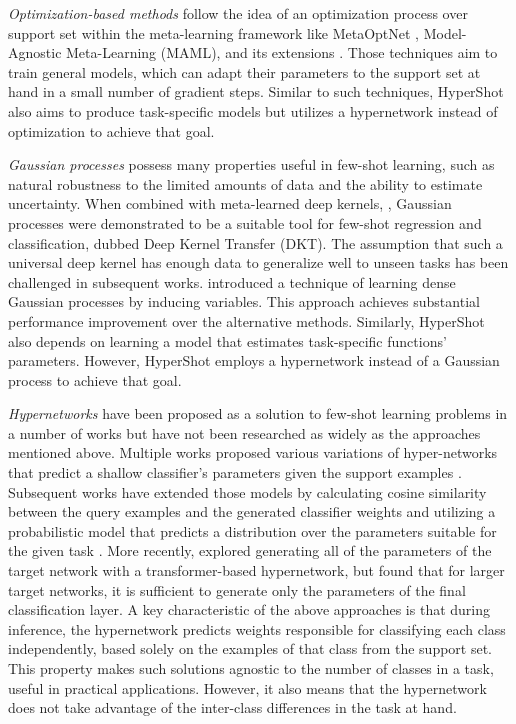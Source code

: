 \documentclass[nohyperref]{article}
\def\our{HyperShot}
\theoremstyle{plain}
\theoremstyle{definition}
\theoremstyle{remark}
\begin{document}
{\em Optimization-based methods} follow the idea of an optimization process over support set within the meta-learning framework like MetaOptNet \cite{lee2019meta}, Model-Agnostic Meta-Learning (MAML), and its extensions \cite{finn2017model,nichol2018first,raghu2019rapid,rajeswaran2019meta,finn2018probabilistic,nichol2018first}. Those techniques aim to train general models, which can adapt their parameters to the support set at hand in a small number of gradient steps. Similar to such techniques, \our{} also aims to produce task-specific models but utilizes a hypernetwork instead of optimization to achieve that goal. 


{\em Gaussian processes} \cite{rasmussen2003gaussian} possess many properties useful in few-shot learning, such as natural robustness to the limited amounts of data and the ability to estimate uncertainty. When combined with meta-learned deep kernels,  \cite{patacchiola2020bayesian}, Gaussian processes were demonstrated to be a suitable tool for few-shot regression and classification, dubbed Deep Kernel Transfer (DKT). The assumption that such a universal deep kernel has enough data to generalize well to unseen tasks has been challenged in subsequent works. \cite{wang2021learning} introduced a technique of learning dense Gaussian processes by inducing variables. This approach achieves substantial performance improvement over the alternative methods. Similarly, \our{} also depends on learning a model that estimates task-specific functions' parameters. However, \our{} employs a hypernetwork instead of a Gaussian process to achieve that goal. 

{\em Hypernetworks} \cite{ha2016hypernetworks} have been proposed as a solution to few-shot learning problems in a number of works but have not been researched as widely as the approaches mentioned above. Multiple works proposed various variations of hyper-networks that predict a shallow classifier's parameters given the support examples \cite{bauer2017discriminative,qiao2017fewshot}. Subsequent works have extended those models by calculating cosine similarity between the query examples and the generated classifier weights \cite{gidaris2018dynamic} and utilizing a probabilistic model that predicts a distribution over the parameters suitable for the given task \cite{gordon2018meta}. More recently, \cite{zhmoginov2022hypertransformer} explored generating all of the parameters of the target network with a transformer-based hypernetwork, but found that for larger target networks, it is sufficient to generate only the parameters of the final classification layer.
A key characteristic of the above approaches is that during inference, the hypernetwork predicts weights responsible for classifying each class independently, based solely on the examples of that class from the support set. This property makes such solutions agnostic to the number of classes in a task, useful in practical applications. However, it also means that the hypernetwork does not take advantage of the inter-class differences in the task at hand.  
\end{document}
